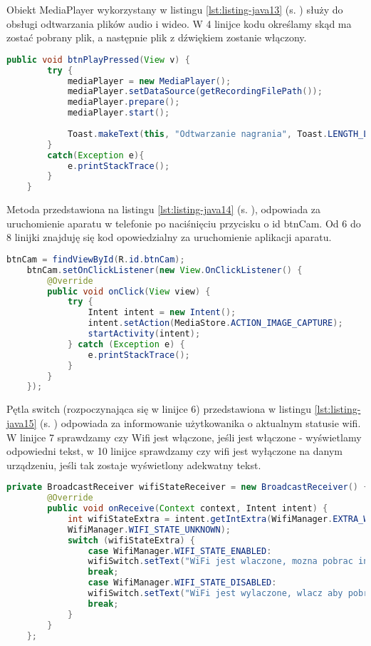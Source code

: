 Obiekt MediaPlayer wykorzystany w listingu \ref{lst:listing-java13} (s. \pageref{lst:listing-java13}) służy do obsługi odtwarzania plików audio i wideo. W 4 linijce kodu określamy skąd ma zostać pobrany plik, a następnie plik z dźwiękiem zostanie włączony.
\begin{lstlisting}[caption=Mikrofon - Odtworzenie nagrania, label={lst:listing-java13}, language=Java]
	public void btnPlayPressed(View v) {
		try {
			mediaPlayer = new MediaPlayer();
			mediaPlayer.setDataSource(getRecordingFilePath());
			mediaPlayer.prepare();
			mediaPlayer.start();
				
			Toast.makeText(this, "Odtwarzanie nagrania", Toast.LENGTH_LONG).show();
		}
		catch(Exception e){
			e.printStackTrace();
		}
	}
\end{lstlisting}

\newpage

Metoda przedstawiona na listingu \ref{lst:listing-java14} (s. \pageref{lst:listing-java14}), odpowiada za uruchomienie aparatu w telefonie po naciśnięciu przycisku o id btnCam. Od 6 do 8 linijki znajduję się kod opowiedzialny za uruchomienie aplikacji aparatu.
\begin{lstlisting}[caption=Aparat - Włączenie aparatu, label={lst:listing-java14}, language=Java]
	btnCam = findViewById(R.id.btnCam);
	btnCam.setOnClickListener(new View.OnClickListener() {
		@Override
		public void onClick(View view) {
			try {
				Intent intent = new Intent();
				intent.setAction(MediaStore.ACTION_IMAGE_CAPTURE);
				startActivity(intent);
			} catch (Exception e) {
				e.printStackTrace();
			}
		}
	});
\end{lstlisting}

Pętla switch (rozpoczynająca się w linijce 6) przedstawiona w listingu \ref{lst:listing-java15} (s. \pageref{lst:listing-java15}) odpowiada za informowanie użytkowanika o aktualnym statusie wifi. W linijce 7 sprawdzamy czy Wifi jest włączone, jeśli jest włączone - wyświetlamy odpowiedni tekst, w 10 linijce sprawdzamy czy wifi jest wyłączone na danym urządzeniu, jeśli tak zostaje wyświetlony adekwatny tekst.
\begin{lstlisting}[caption=Wifi - Sprawdzenie statusu Wifi, label={lst:listing-java15}, language=Java]
	private BroadcastReceiver wifiStateReceiver = new BroadcastReceiver() {
		@Override
		public void onReceive(Context context, Intent intent) {
			int wifiStateExtra = intent.getIntExtra(WifiManager.EXTRA_WIFI_STATE,
			WifiManager.WIFI_STATE_UNKNOWN);
			switch (wifiStateExtra) {
				case WifiManager.WIFI_STATE_ENABLED:
				wifiSwitch.setText("WiFi jest wlaczone, mozna pobrac informacje");
				break;
				case WifiManager.WIFI_STATE_DISABLED:
				wifiSwitch.setText("WiFi jest wylaczone, wlacz aby pobrac informacje");
				break;
			}
		}
	};
\end{lstlisting}

